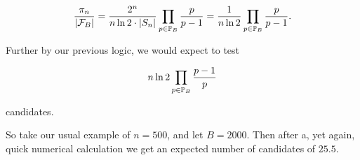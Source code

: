   \begin{equation}
    \frac{\pi_n}{\left| \mathcal{F}_B \right|} = \frac{2^n}{n\ln 2 \cdot \left| S_n \right|} \prod_{p \in \mathbb{P}_B} \frac{p}{p-1}
    = \frac{1}{n \ln 2} \prod_{p \in \mathbb{P}_B} \frac{p}{p-1}.
    \label{eq:probability-of-prime-in-fb}
  \end{equation}

  Further by our previous logic, we would expect to test

  \begin{equation}
    n \ln 2 \prod_{p \in \mathbb{P}_B} \frac{p-1}{p}
    \label{eq:candidates-teste-with-filtration}
  \end{equation}
  
  candidates.

  So take our usual example of $n = 500$, and let $B = 2000$.
  Then after a, yet again, quick numerical calculation we get an expected number of candidates of $25.5$.
